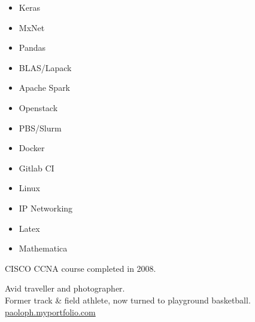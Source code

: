 %
\smallskip

\divider
{}


\smallskip

\smallskip


\smallskip
{}

\medskip

\smallskip

\medskip


\medskip

\begin{multicols}{2}
   \noindent
\begin{itemize}[noitemsep,topsep=0pt]
\item Keras
\item MxNet
\item Pandas
\item BLAS/Lapack
\item Apache Spark
\item Openstack
\item PBS/Slurm
\item Docker
\item Gitlab CI
\item Linux
\item IP Networking
\item Latex
\item Mathematica
\end{itemize}
\end{multicols}

\smallskip
CISCO CCNA course completed in 2008.

Avid traveller and photographer.\\
Former track \& field athlete, now turned to playground basketball.\\
\medskip
\faCamera \hspace{0.4pc} \url{paoloph.myportfolio.com}

\vfill
\divider